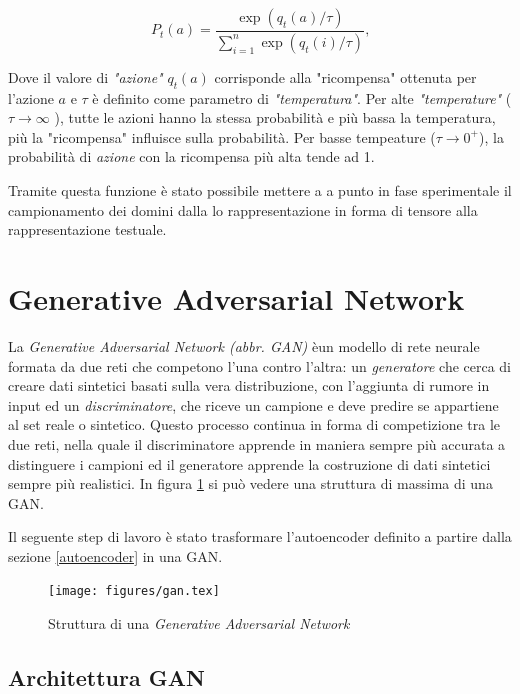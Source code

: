 \[P_t(a) = \frac{\exp(q_t(a)/\tau)}{\sum_{i=1}^n\exp(q_t(i)/\tau)} \text{,}\]

Dove il valore di\textit{ "azione"} $q_{t}(a)$ corrisponde alla "ricompensa" ottenuta per l'azione $a$ e $\tau$  è definito come parametro di \textit{"temperatura"}. Per alte \textit{"temperature"} ( $\tau \to \infty$ ), tutte le azioni hanno la stessa probabilità e più bassa la temperatura, più la "ricompensa" influisce sulla probabilità. Per basse tempeature ($\tau \to 0^{+}$), la probabilità di \textit{azione} con la ricompensa più alta tende ad 1. 

Tramite questa funzione è stato possibile mettere a a punto in fase sperimentale il campionamento dei domini dalla lo rappresentazione in forma di tensore alla rappresentazione testuale.

\section{Generative Adversarial Network}
\label{ganintro}
La \textit{Generative Adversarial Network (abbr. GAN)} èun modello di rete neurale formata da due reti che competono l'una contro l'altra: un \textit{generatore} che cerca di creare dati sintetici basati sulla vera distribuzione, con l'aggiunta di rumore in input ed un \textit{discriminatore}, che riceve un campione e deve predire se appartiene al set reale o sintetico. Questo processo continua in forma di competizione tra le due reti, nella quale il discriminatore apprende in maniera sempre più accurata a distinguere i campioni ed il generatore apprende la costruzione di dati sintetici sempre più realistici. In figura \ref{fig:gan} si può vedere una struttura di massima di una GAN.

Il seguente step di lavoro è stato trasformare l'autoencoder definito a partire dalla sezione \ref{autoencoder} in una GAN.
\begin{figure}[!htb]
    \centering
	\texttt{[image: figures/gan.tex]}
	\caption{Struttura di una \textit{Generative Adversarial Network}}
\label{fig:gan}
\end{figure}


\subsection{Architettura GAN}
\label{ganarch}


